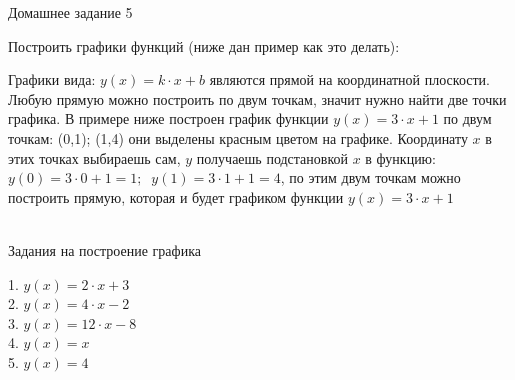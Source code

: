 \documentclass{article}
\begin{document}
{\fontsize{20}{18} \selectfont Домашнее задание 5}
\newline




{\fontsize{14}{10} \selectfont  Построить графики функций (ниже дан пример как это делать): } \newline



{\fontsize{12}{8} \selectfont \color{gray} Графики вида: $y(x) = k\cdot x + b $ являются прямой на координатной плоскости.
Любую прямую можно построить по двум точкам, значит нужно найти две точки графика. 
В примере ниже построен график функции $y(x) = 3\cdot x + 1$ по двум точкам: (0,1); (1,4) они выделены красным цветом на графике. 
Координату $x$ в этих точках выбираешь сам, 
$y$ получаешь подстановкой $x$ в функцию: $y(0) = 3\cdot 0 + 1 = 1; \; \; y(1) = 3\cdot 1 + 1 = 4$, 
по этим двум точкам можно построить прямую, которая и будет графиком функции $y(x) = 3\cdot x + 1$} \\ \\

\vspace{2cm}


\vspace{4cm}

{\fontsize{13}{9} \selectfont Задания на построение графика} \newline




1. $y(x) = 2\cdot x + 3$ \\



2. $y(x) = 4\cdot x - 2$ \\



3. $y(x) = 12\cdot x - 8$ \\



4. $y(x) = x$ \\



5. $y(x) = 4$
\end{document}

